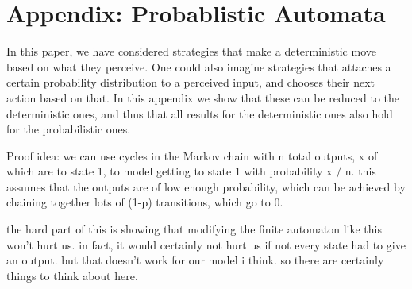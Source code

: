 \documentclass[11pt]{amsart}
\theoremstyle{definition}
\theoremstyle{remark}
\begin{document}
    \section{Appendix: Probablistic Automata}

    In this paper, we have considered strategies that make a deterministic move based on what they perceive. One could also imagine strategies that attaches a certain probability distribution to a perceived input, and chooses their next action based on that. In this appendix we show that these can be reduced to the deterministic ones, and thus that all results for the deterministic ones also hold for the probabilistic ones.

    Proof idea: we can use cycles in the Markov chain with n total outputs, x of which are to state 1, to model getting to state 1 with probability x / n. this assumes that the outputs are of low enough probability, which can be achieved by chaining together lots of (1-p) transitions, which go to 0.

    the hard part of this is showing that modifying the finite automaton like this won't hurt us. in fact, it would certainly not hurt us if not every state had to give an output. but that doesn't work for our model i think. so there are certainly things to think about here.



    
    
\end{document}
